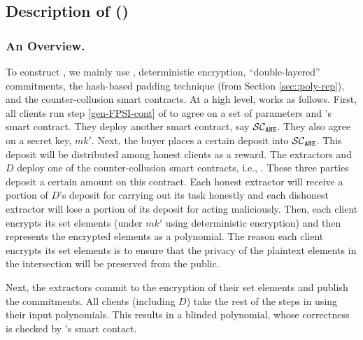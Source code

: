 

\vs


\subsection{Description of \withRew (\epsi)}



\subsubsection{An Overview.} To construct  \epsi, we mainly use \fpsi, deterministic encryption, ``double-layered'' commitments, the hash-based padding technique (from Section \ref{sec::poly-rep}), and the counter-collusion smart contracts. %
%
At a high level, \epsi works as follows. First, all clients run step \ref{gen-FPSI-cont} of \fpsi to agree on a set of parameters and \fpsi's smart contract.  They deploy another smart contract, say $\mathcal{SC}_{\mathtt{ANE}}$. They also agree on a secret key, $mk'$. Next, the buyer places a certain deposit into $\mathcal{SC}_{\mathtt{ANE}}$. This deposit will be distributed among honest clients as a reward. 
%
%
The extractors and $D$ deploy one of the counter-collusion smart contracts, i.e., \SCpc. These three parties deposit a certain amount on this contract.  Each honest extractor will receive a portion of $D$'s deposit for carrying out its task honestly and each dishonest extractor will lose a portion of its deposit for acting maliciously. 
%
Then, each client encrypts its set elements (under $mk'$ using deterministic encryption) and then represents the encrypted elements as a polynomial. The reason each client encrypts its set elements is to ensure that the privacy of the plaintext elements in the intersection will be preserved from the public. 








%
Next, the extractors commit to the encryption of their set elements and publish the commitments. 
%
All clients (including $D$) take the rest of the steps in \fpsi using their input polynomials. This results in a blinded polynomial,  whose correctness is checked by \fpsi's smart contact. 

